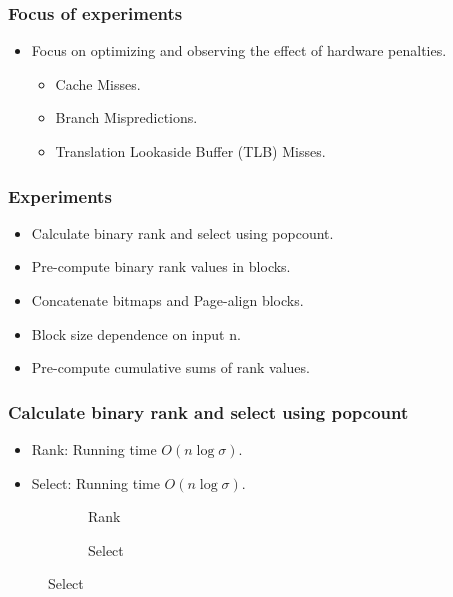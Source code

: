 \documentclass{beamer}
\begin{document}

\begin{frame}
\frametitle{Focus of experiments}
\begin{itemize}
\item Focus on optimizing and observing the effect of hardware penalties.
	\begin{itemize}
	\item Cache Misses.
	\item Branch Mispredictions.
	\item Translation Lookaside Buffer (TLB) Misses.
	\end{itemize}
\end{itemize}
\end{frame}


\begin{frame}
\frametitle{Experiments}
\begin{itemize}
\item Calculate binary rank and select using popcount.
\item Pre-compute binary rank values in blocks.
\item Concatenate bitmaps and Page-align blocks.
\item Block size dependence on input n.
\item Pre-compute cumulative sums of rank values.
\end{itemize}
\end{frame}



\begin{frame}
\frametitle{Calculate binary rank and select using popcount}
\begin{itemize}
\item Rank: Running time $O(n \log \sigma)$.
\item Select: Running time $O(n \log \sigma)$.
\end{itemize}
\begin{figure}[h!]\tiny
	\begin{subfigure}{\textwidth}
		\center \scalebox{.6}{}
		\caption{\tiny{Rank}}
	\end{subfigure}
	\begin{subfigure}{\textwidth}
		\center \scalebox{.6}{}
		\caption{\tiny{Select}}
	\end{subfigure}
\end{figure}
\end{frame}
\end{document}
